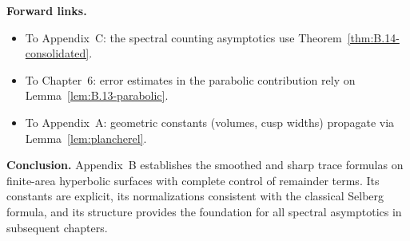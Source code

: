 \medskip
\noindent
\textbf{Forward links.}
\begin{itemize}
  \item To Appendix~C: the spectral counting asymptotics use Theorem~\ref{thm:B.14-consolidated}.
  \item To Chapter~6: error estimates in the parabolic contribution rely on Lemma~\ref{lem:B.13-parabolic}.
  \item To Appendix~A: geometric constants (volumes, cusp widths) propagate via Lemma~\ref{lem:plancherel}.
\end{itemize}

\medskip
\noindent
\textbf{Conclusion.}
Appendix~B establishes the smoothed and sharp trace formulas on finite-area
hyperbolic surfaces with complete control of remainder terms. Its constants are
explicit, its normalizations consistent with the classical Selberg formula, and
its structure provides the foundation for all spectral asymptotics in subsequent
chapters.
